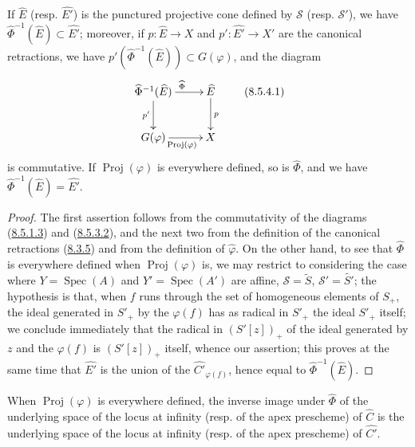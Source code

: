 \begin{proposition}[8.5.4]
\label{II.8.5.4}
If $\widehat{E}$ (resp. $\widehat{E'}$) is the punctured projective cone defined
by $\mathcal{S}$ (resp. $\mathcal{S}'$), we have
$\widehat{\Phi}^{-1}(\widehat{E})\subset\widehat{E'}$; moreover, if
$p:\widehat{E}\to X$ and $p':\widehat{E'}\to X'$ are the canonical
retractions, we have
$p'(\widehat{\Phi}^{-1}(\widehat{E}))\subset G(\varphi)$, and the diagram
\begin{equation}
\label{II.8.5.4.1}
  \xymatrix{
    \widehat{\Phi}^{-1}(\widehat{E})
      \ar[r]^{\widehat{\Phi}}\ar[d]_{p'} &
    \widehat{E}\ar[d]^{p}\\
    G(\varphi)\ar[r]_{\operatorname{Proj}(\varphi)} & X
  }
\tag{8.5.4.1}
\end{equation}
is commutative. If $\operatorname{Proj}(\varphi)$ is everywhere defined, so is
$\widehat{\Phi}$, and we have
$\widehat{\Phi}^{-1}(\widehat{E})=\widehat{E'}$.
\end{proposition}

\begin{proof}
The first assertion follows from the commutativity of the diagrams
(\hyperref[II.8.5.1.3]{8.5.1.3}) and
(\hyperref[II.8.5.3.2]{8.5.3.2}), and the next two from the definition
of the canonical retractions (\hyperref[II.8.3.5]{8.3.5}) and from the definition
of $\widehat{\varphi}$. On the other hand, to see that $\widehat{\Phi}$ is
everywhere defined when $\operatorname{Proj}(\varphi)$ is, we
may restrict to considering the case where $Y=\operatorname{Spec}(A)$ and
$Y'=\operatorname{Spec}(A')$ are affine,
$\mathcal{S}=\widetilde{S}$, $\mathcal{S}'=\widetilde{S'}$; the hypothesis is
that, when $f$ runs through the set of homogeneous elements of $S_+$, the ideal
generated in $S'_+$ by the $\varphi(f)$ has as radical in $S'_+$ the ideal
$S'_+$ itself; we conclude immediately that the radical in $(S'[z])_+$ of
the ideal generated by $z$ and the $\varphi(f)$ is $(S'[z])_+$ itself, whence
our assertion; this proves at the same time that $\widehat{E'}$ is the union of the
$\widehat{C'}_{\varphi(f)}$, hence equal to
$\widehat{\Phi}^{-1}(\widehat{E})$.
\end{proof}

\begin{corollary}[8.5.5]
\label{II.8.5.5}
When $\operatorname{Proj}(\varphi)$ is everywhere defined, the inverse image
under $\widehat{\Phi}$ of the underlying space of the locus at infinity (resp. of the
apex prescheme) of $\widehat{C}$ is the underlying space of the locus at
infinity (resp. of the apex prescheme) of $\widehat{C'}$.
\end{corollary}

